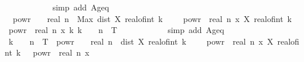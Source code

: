 \begin{isabellebody}
\ \ \ \ \ \ \ \ \ \ \isamarkupfalse%
\ {\isacharparenleft}{\kern0pt}simp\ add{\isacharcolon}{\kern0pt}\ A{\isacharunderscore}{\kern0pt}geq{\isacharparenright}{\kern0pt}\isanewline
\ \ \ \ \ \ \ \ \isamarkupfalse%
\ {\isacharasterisk}{\kern0pt}\ \isamarkupfalse%
\ {\isachardoublequoteopen}{}\ powr\ {\isacharparenleft}{\kern0pt}{\isacharminus}{\kern0pt}\ {\isasymgamma}\ {\isacharasterisk}{\kern0pt}\ real\ n{\isacharparenright}{\kern0pt}\ {\isasymle}\ Max\ {\isacharbraceleft}{\kern0pt}dist\ {\isacharparenleft}{\kern0pt}X\ {\isacharparenleft}{\kern0pt}real{\isacharunderscore}{\kern0pt}of{\isacharunderscore}{\kern0pt}int\ {\isacharparenleft}{\kern0pt}k\ {\isacharminus}{\kern0pt}\ {}{\isacharparenright}{\kern0pt}\ {\isacharasterisk}{\kern0pt}\ {}\ powr\ {\isacharminus}{\kern0pt}\ real\ n{\isacharparenright}{\kern0pt}\ x{\isacharparenright}{\kern0pt}\ {\isacharparenleft}{\kern0pt}X\ {\isacharparenleft}{\kern0pt}real{\isacharunderscore}{\kern0pt}of{\isacharunderscore}{\kern0pt}int\ k\ {\isacharasterisk}{\kern0pt}\ {}\ powr\ {\isacharminus}{\kern0pt}\ real\ n{\isacharparenright}{\kern0pt}\ x{\isacharparenright}{\kern0pt}\ {\isacharbar}{\kern0pt}k{\isachardot}{\kern0pt}\ k\ {\isasymin}\ {\isacharbraceleft}{\kern0pt}{}{\isachardot}{\kern0pt}{\isachardot}{\kern0pt}{\isasymlfloor}{}\ {\isacharcircum}{\kern0pt}\ n\ {\isacharasterisk}{\kern0pt}\ T{\isasymrfloor}{\isacharbraceright}{\kern0pt}{\isacharbraceright}{\kern0pt}{\isachardoublequoteclose}\isanewline
\ \ \ \ \ \ \ \ \ \ \isamarkupfalse%
\ {\isacharparenleft}{\kern0pt}simp\ add{\isacharcolon}{\kern0pt}\ A{\isacharunderscore}{\kern0pt}geq{\isacharparenright}{\kern0pt}\isanewline
\ \ \ \ \ \ \ \ \isamarkupfalse%
\ \isamarkupfalse%
\ {\isachardoublequoteopen}{\isasymexists}k\ {\isasymin}\ {\isacharbraceleft}{\kern0pt}{}{\isachardot}{\kern0pt}{\isachardot}{\kern0pt}{\isasymlfloor}{}\ {\isacharcircum}{\kern0pt}\ n\ {\isacharasterisk}{\kern0pt}\ T{\isasymrfloor}{\isacharbraceright}{\kern0pt}{\isachardot}{\kern0pt}\ {}\ powr\ {\isacharparenleft}{\kern0pt}{\isacharminus}{\kern0pt}\ {\isasymgamma}\ {\isacharasterisk}{\kern0pt}\ real\ n{\isacharparenright}{\kern0pt}\ {\isasymle}\ dist\ {\isacharparenleft}{\kern0pt}X\ {\isacharparenleft}{\kern0pt}real{\isacharunderscore}{\kern0pt}of{\isacharunderscore}{\kern0pt}int\ {\isacharparenleft}{\kern0pt}k\ {\isacharminus}{\kern0pt}\ {}{\isacharparenright}{\kern0pt}\ {\isacharasterisk}{\kern0pt}\ {}\ powr\ {\isacharminus}{\kern0pt}\ real\ n{\isacharparenright}{\kern0pt}\ x{\isacharparenright}{\kern0pt}\ {\isacharparenleft}{\kern0pt}X\ {\isacharparenleft}{\kern0pt}real{\isacharunderscore}{\kern0pt}of{\isacharunderscore}{\kern0pt}int\ k\ {\isacharasterisk}{\kern0pt}\ {}\ powr\ {\isacharminus}{\kern0pt}\ real\ n{\isacharparenright}{\kern0pt}\ x{\isacharparenright}{\kern0pt}{\isachardoublequoteclose}\isanewline

\end{isabellebody}
